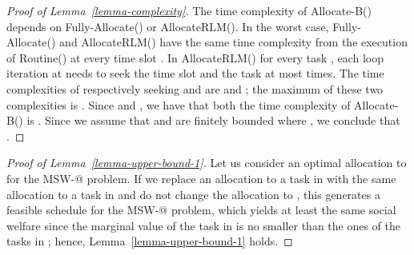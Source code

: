 \documentclass[10pt,journal,compsoc]{IEEEtran}
\makeatletter
\newcommand{\Rmnum}[1]{\expandafter\@slowromancap\romannumeral #1@}
\makeatother
\begin{document}
\begin{proof}[Proof of Lemma~\ref{lemma-complexity}]
The time complexity of Allocate-B() depends on Fully-Allocate() or AllocateRLM(). In the worst case, Fully-Allocate() and AllocateRLM() have the same time complexity from the execution of Routine() at every time slot . In AllocateRLM() for every task , each loop iteration at  needs to seek the time slot  and the task  at most  times. The time complexities of respectively seeking  and  are  and ; the maximum of these two complexities is . Since  and , we have that both the time complexity of Allocate-B() is . Since we assume that  and  are finitely bounded where , we conclude that .\end{proof}



\begin{proof}[Proof of Lemma~\ref{lemma-upper-bound-1}]
 Let us consider an optimal allocation to  for the MSW-\Rmnum{1} problem. If we replace an allocation to a task in  with the same allocation to a task in  and do not change the allocation to , this generates a feasible schedule for the MSW-\Rmnum{2} problem, which yields at least the same social welfare since the marginal value of the task in  is no smaller than the ones of the tasks in ; hence, Lemma~\ref{lemma-upper-bound-1} holds.
\end{proof}
\end{document}

